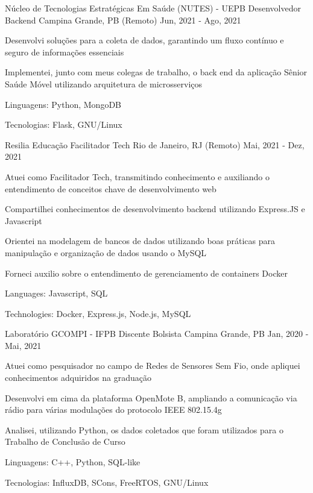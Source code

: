 \begin{cventries}
  \cventry
  {Núcleo de Tecnologias Estratégicas Em Saúde (NUTES) - UEPB} %
  {Desenvolvedor Backend} %
  {Campina Grande, PB (Remoto)} %
  {Jun, 2021 - Ago, 2021} %
  {
    \begin{cvitems} %
      \item {Desenvolvi soluções para a coleta de dados, garantindo um fluxo contínuo e seguro de informações essenciais}
      \item {Implementei, junto com meus colegas de trabalho, o back end da aplicação Sênior Saúde Móvel utilizando arquitetura de microsserviços}
      \item {Linguagens: Python, MongoDB}
      \item {Tecnologias: Flask, GNU/Linux}
    \end{cvitems}
  }

  \cventry
  {Resilia Educação} %
  {Facilitador Tech} %
  {Rio de Janeiro, RJ (Remoto)} %
  {Mai, 2021 - Dez, 2021} %
  {
    \begin{cvitems} %
      \item {Atuei como Facilitador Tech, transmitindo conhecimento e auxiliando o entendimento de conceitos chave de desenvolvimento web}
      \item {Compartilhei conhecimentos de desenvolvimento backend utilizando Express.JS e Javascript}
      \item {Orientei na modelagem de bancos de dados utilizando boas práticas para manipulação e organização de dados usando o MySQL}
      \item {Forneci auxilio sobre o entendimento de gerenciamento de containers Docker}
      \item {Languages: Javascript, SQL}
      \item {Technologies: Docker, Express.js, Node.js, MySQL}
    \end{cvitems}
  }

  \cventry
  {Laboratório GCOMPI - IFPB} %
  {Discente Bolsista} %
  {Campina Grande, PB} %
  {Jan, 2020 - Mai, 2021} %
  {
    \begin{cvitems} %
      \item {Atuei como pesquisador no campo de Redes de Sensores Sem Fio, onde apliquei conhecimentos adquiridos na graduação}
      \item {Desenvolvi em cima da plataforma OpenMote B, ampliando a comunicação via rádio para várias modulações do protocolo IEEE 802.15.4g}
      \item {Analisei, utilizando Python, os dados coletados que foram utilizados para o Trabalho de Conclusão de Curso}
      \item {Linguagens: C++, Python, SQL-like}
      \item {Tecnologias: InfluxDB, SCons, FreeRTOS, GNU/Linux}
    \end{cvitems}
  }
\end{cventries}
